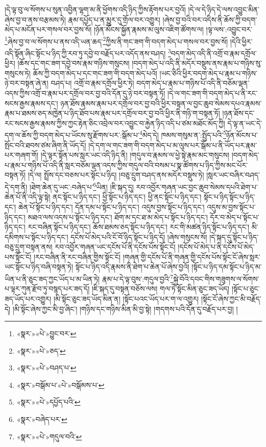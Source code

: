 །དེ་ལྟ་བུ་ལ་སོགས་པ་སུན་འབྱིན་ལྷག་མ་ནི་ཕྱོགས་འདི་ཉིད་ཀྱིས་རྟོགས་པར་བྱའོ། །དེ་ལ་དེ་ཉིད་དེ་ལས་འབྱུང་མིན་ཞེས་བྱ་བ་ནས་བརྩམས་ཏེ། རྣམ་དཔྱོད་པ་ན་མྱུར་དུ་གྲོལ་བར་འགྱུར། །ཞེས་བྱ་བའི་བར་འདིས་ནི་ཆོས་ཀྱི་བདག་མེད་པ་མངོན་པར་གསལ་བར་བྱས་སོ། །ཉོན་མོངས་སྐྱོན་རྣམས་མ་ལུས་འཇིག་ཚོགས་ལ། །ལྟ་ལས་:འབྱུང་བར་\footnote{«སྣར་»«པེ་»བྱུང་བར་}ཞེས་བྱ་བ་ལ་སོགས་པ་ནས་འདི་ཡན་ཆད་\footnote{«སྣར་»«པེ་»ཅད་}ཀྱིས་ནི་གང་ཟག་གི་བདག་མེད་པ་གསལ་བར་བྱས་སོ། །དེའི་ཕྱིར་འདི་སྟོན་ཞིང་སྟོང་པ་ཉིད་ཀྱི་རབ་ཏུ་དབྱེ་བ་བརྗོད་པར་འདོད་ནས་བཤད། \footnote{«སྣར་»«པེ་»བཤད་པ་}བདག་མེད་འདི་ནི་འགྲོ་བ་རྣམ་དགྲོལ་ཕྱིར། །ཆོས་དང་གང་ཟག་དབྱེ་བས་རྣམ་གཉིས་གསུངས། །བདག་མེད་པ་འདི་ནི་མདོར་བསྡུས་ནས་རྣམ་པ་གཉིས་སུ་གསུངས་ཏེ། ཆོས་ཀྱི་བདག་མེད་པ་དང་གང་ཟག་གི་བདག་མེད་པའོ། །ཡང་ཅིའི་ཕྱིར་བདག་མེད་པ་རྣམ་པ་གཉིས་ཉེ་བར་བསྟན་ཞེ་ན། བཤད་པ། འགྲོ་བ་རྣམ་དགྲོལ་ཕྱིར་ཏེ། བདག་མེད་པ་རྣམ་པ་གཉིས་པོ་འདི་ནི་བཅོམ་ལྡན་འདས་ཀྱིས་འགྲོ་བ་རྣམ་པར་དགྲོལ་བར་བྱ་བའི་དོན་དུ་ཉེ་བར་བསྟན་ཏོ། །དེ་ལ་གང་ཟག་གི་བདག་མེད་པ་ནི་རང་སངས་རྒྱས་རྣམས་དང་། ཉན་ཐོས་རྣམས་རྣམ་པར་དགྲོལ་བར་བྱ་བའི་ཕྱིར་བསྟན་ལ་བྱང་ཆུབ་སེམས་དཔའ་རྣམས་རྣམ་པ་ཐམས་ཅད་མཁྱེན་པ་ཉིད་ཐོབ་པས་རྣམ་པར་དགྲོལ་བར་བྱ་བའི་ཕྱིར་ནི་གཉི་ག་བསྟན་ཏོ། །ཉན་ཐོས་དང་རང་སངས་རྒྱས་རྣམས་ཀྱིས་ཀྱང་རྟེན་ཅིང་འབྲེལ་བར་འབྱུང་བ་རྐྱེན་ཉིད་འདི་པ་ཙམ་མཐོང་མོད་ཀྱི། དེ་ལྟ་ན་ཡང་དེ་དག་ལ་ཆོས་ཀྱི་བདག་མེད་པ་ཡོངས་སུ་རྫོགས་པར་:སྒོམ་པ་\footnote{«སྣར་»བསྒོམ་པ་«པེ་»བསྒོམས་པ་}མེད་དེ། ཁམས་གསུམ་ན་:སྤྱོད་པའི་\footnote{«སྣར་»«པེ་»དཔྱོད་པའི་}ཉོན་མོངས་པ་སྤོང་བའི་ཐབས་ཙམ་ཞིག་ནི་ཡོད་དོ། །དེ་དག་ལ་གང་ཟག་གི་བདག་མེད་པ་མ་ལུས་པར་སྒོམ་པ་ནི་ཡོད་པར་རྣམ་པར་གཞག་གོ། །དེ་ལྟར་སྟོན་པས་སླར་ཡང་འདི་ཉིད་ནི། །གདུལ་བ་རྣམས་ལ་ཕྱེ་སྟེ་རྣམ་མང་གསུངས། །བདག་མེད་པ་རྣམ་པ་གཉིས་པོ་འདི་ནི་སླར་བཅོམ་ལྡན་འདས་ཀྱིས་གདུལ་བའི་བསམ་པ་སྣ་ཚོགས་པ་ཉིད་ཀྱིས་མང་པོར་བསྟན་ཏོ། །དེ་ལ། སྤྲོས་དང་བཅས་པར་སྟོང་པ་ཉིད། །བཅུ་དྲུག་བཤད་ནས་མདོར་བསྡུས་ཏེ། །སླར་ཡང་བཞིར་བཤད་དེ་དག་ནི། །ཐེག་ཆེན་དུ་ཡང་:བཞེད་པ་\footnote{«སྣར་»བཞེད་པར་}ཡིན། །ཇི་སྐད་དུ། རབ་འབྱོར་གཞན་ཡང་བྱང་ཆུབ་སེམས་དཔའི་ཐེག་པ་ཆེན་པོ་ནི་འདི་ལྟ་སྟེ། ནང་སྟོང་པ་ཉིད་དང་། ཕྱི་སྟོང་པ་ཉིད་དང་། ཕྱི་ནང་སྟོང་པ་ཉིད་དང་། སྟོང་པ་ཉིད་སྟོང་པ་ཉིད་དང་། ཆེན་པོ་སྟོང་པ་ཉིད་དང་། དོན་དམ་པ་སྟོང་པ་ཉིད་དང་། འདུས་བྱས་སྟོང་པ་ཉིད་དང་། འདུས་མ་བྱས་སྟོང་པ་ཉིད་དང་། མཐའ་ལས་འདས་པ་སྟོང་པ་ཉིད་དང་། ཐོག་མ་དང་ཐ་མ་མེད་པ་སྟོང་པ་ཉིད་དང་། དོར་བ་མེད་པ་སྟོང་པ་ཉིད་དང་། རང་བཞིན་སྟོང་པ་ཉིད་དང་། ཆོས་ཐམས་ཅད་སྟོང་པ་ཉིད་དང་། རང་གི་མཚན་ཉིད་སྟོང་པ་ཉིད་དང་། མི་དམིགས་པ་སྟོང་པ་ཉིད་དང་། དངོས་པོ་མེད་པའི་ངོ་བོ་ཉིད་སྟོང་པ་ཉིད་དོ། །ཞེས་གསུངས་སོ། །དེ་སྐད་དུ་སྟོང་པ་ཉིད་བཅུ་དྲུག་བསྟན་ནས། རབ་འབྱོར་གཞན་ཡང་དངོས་པོ་ནི་དངོས་པོས་སྟོང་ངོ། །དངོས་པོ་མེད་པ་ནི་དངོས་པོ་མེད་པས་སྟོང་ངོ། །རང་བཞིན་ནི་རང་བཞིན་གྱིས་སྟོང་ངོ། །གཞན་གྱི་དངོས་པོ་ནི་གཞན་གྱི་དངོས་པོས་སྟོང་ངོ་ཞེས་སླར་ཡང་སྟོང་པ་ཉིད་བཞི་བསྟན་ཏེ། སྟོང་པ་ཉིད་འདི་རྣམས་ནི་ཐེག་པ་ཆེན་པོ་ཞེས་བྱའོ། །སྟོང་པ་ཉིད་དམ་སྟོང་པ་ཉིད་མ་ཡིན་པ་ནི་ཅུང་ཟད་ཀྱང་ཡོད་པ་མ་ཡིན་ཏེ། རྣམ་པ་དེ་ལྟ་བུས་:གདུལ་བྱའི་\footnote{«སྣར་»«པེ་»གདུལ་བའི་}སྐྱེ་བོའི་དབང་གིས་གཟུགས་ལ་སོགས་པ་ལྟར་ཀུན་རྫོབ་ཏུ་བསྙད་པར་ཟད་དོ། །ཇི་སྐད་དུ་བསྟན་བཅོས་ལས། གལ་ཏེ་སྟོང་མིན་ཅུང་ཟད་ཡོད། །སྟོང་པ་ཅུང་ཟད་ཡོད་པར་འགྱུར། །མི་སྟོང་ཅུང་ཟད་ཡོད་མིན་ན། །སྟོང་པའང་ཡོད་པར་ག་ལ་འགྱུར། །སྟོང་ངོ་ཞེས་ཀྱང་མི་བརྗོད་དེ། །མི་སྟོང་ཞེས་ཀྱང་མི་བྱ་ཞིང་། །གཉིས་དང་གཉིས་མིན་མི་བྱ་སྟེ། །གདགས་པའི་དོན་དུ་བརྗོད་པར་བྱ། །
